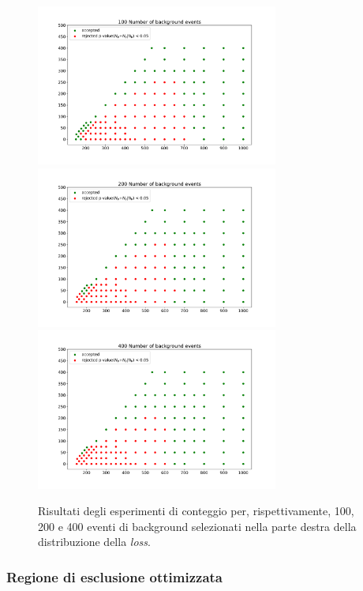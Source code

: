 \begin{figure}[h!]
	\centering
	\includegraphics[width=0.71\textwidth]{figs/risultati_simulazione/100.pdf}
	\includegraphics[width=0.71\textwidth]{figs/risultati_simulazione/200.pdf}
	\includegraphics[width=0.71\textwidth]{figs/risultati_simulazione/400.pdf}
	\caption{Risultati degli esperimenti di conteggio per, rispettivamente, 100, 200 e 400 eventi di background selezionati nella parte destra della distribuzione della \textit{loss}.}
	\label{test-100-200-400}
\end{figure}



\subsubsection{Regione di esclusione ottimizzata}
\label{regione di esclusione}



